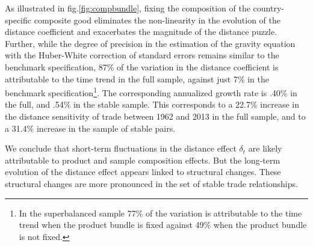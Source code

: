 \documentclass[12pt,twoside,a4paper,notitlepage]{article}
\begin{document}
As illustrated in fig.\ref{fig:compbundle}, fixing the composition of the country-specific composite good  eliminates the non-linearity in the evolution of the distance coefficient and \fi
exacerbates the magnitude of the distance puzzle.
Further, while the degree of precision in the estimation of the gravity equation with the Huber-White correction of standard errors remains similar to the benchmark specification, 87\% of the variation in the distance coefficient is attributable to the time trend in the full sample, against just 7\% in the benchmark specification\footnote{In the superbalanced sample 77\% of the variation is attributable to the time trend when the product bundle is fixed against 49\% when the product bundle is not fixed.}. The corresponding annualized growth rate is .40\% in the full, and .54\% in the stable sample. This corresponds to a 22.7\% increase in the distance sensitivity of trade between 1962 and 2013 in the full sample, and to a 31.4\% increase in the sample of stable pairs.

We conclude that short-term fluctuations in the distance effect $\delta_t$ are likely attributable to product and sample composition effects. But the long-term evolution of the distance effect appears linked to structural changes. These structural changes are more pronounced in the set of stable trade relationships. 

\end{document}
